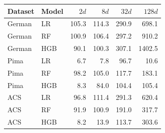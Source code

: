 \begin{tabular}{llrrrr}
\toprule
Dataset & Model & $2d$ & $8d$ & $32d$ & $128d$ \\
\midrule
German & LR & 105.3 & 114.3 & 290.9 & 698.1 \\
German & RF & 100.9 & 106.4 & 297.2 & 910.2 \\
German & HGB & 90.1 & 100.3 & 307.1 & 1402.5 \\
Pima & LR & 6.7 & 7.8 & 96.7 & 10.6 \\
Pima & RF & 98.2 & 105.0 & 117.7 & 183.1 \\
Pima & HGB & 8.3 & 84.0 & 104.4 & 105.4 \\
ACS & LR & 96.8 & 111.4 & 291.3 & 620.4 \\
ACS & RF & 91.9 & 100.9 & 191.0 & 317.7 \\
ACS & HGB & 8.2 & 13.9 & 113.7 & 303.6 \\
\bottomrule
\end{tabular}
